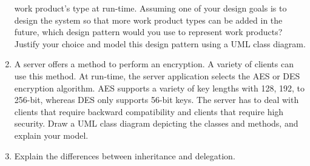 \documentclass[a4paper, 10pt]{article}
\begin{document}
\begin{enumerate}
    work product’s type at run-time. 
    Assuming one of your design goals is to design the system so that more work product types can be added in the future, 
    which design pattern would you use to represent work products? 
    Justify your choice and model this design pattern using a UML class diagram.
    \vspace{0.5cm}
    \item
    A server offers a method to perform an encryption. 
    A variety of clients can use this method. At run-time, 
    the server application selects the AES or DES encryption algorithm. 
    AES supports a variety of key lengths with 128, 192, to 256-bit, whereas DES only supports 56-bit keys. 
    The server has to deal with clients that require backward compatibility and clients that require high security. 
    Draw a UML class diagram depicting the classes and methods, and explain your model.
    \vspace{0.5cm}
    \item
    Explain the differences between inheritance and delegation. 
    \vspace{0.5cm}
\end{enumerate}
\end{document}

